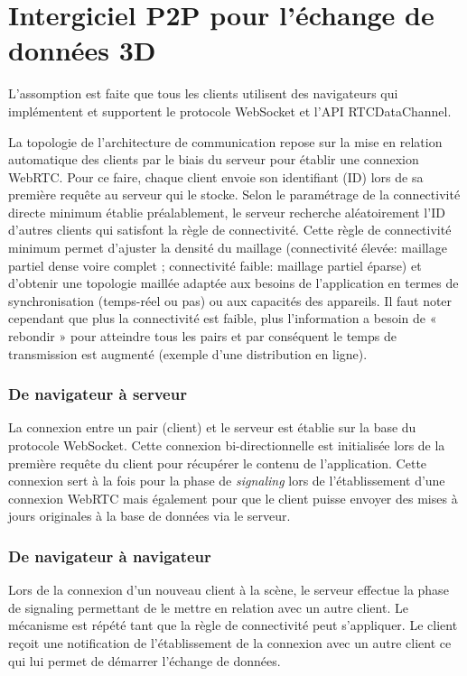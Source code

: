 \section{Intergiciel P2P pour l'échange de données 3D}

L'assomption est faite que tous les clients utilisent des navigateurs qui 
implémentent et supportent le protocole WebSocket et l'\gls{API} 
RTCDataChannel. 

La topologie de l'architecture de communication repose sur la mise en relation 
automatique des clients par le biais du serveur pour établir une connexion 
\gls{WebRTC}. Pour ce faire, chaque client envoie son identifiant (ID) lors de sa 
première requête au serveur qui le stocke. Selon le paramétrage de la connectivité 
directe minimum établie préalablement, le serveur recherche aléatoirement l'ID 
d'autres clients qui satisfont la règle de connectivité. Cette règle de connectivité 
minimum permet d'ajuster la densité du maillage (connectivité élevée: maillage 
partiel dense voire complet ; connectivité faible: maillage partiel éparse) et 
d'obtenir une topologie maillée adaptée aux besoins de l'application en termes de 
synchronisation (temps-réel ou pas) ou aux capacités des appareils. Il faut noter 
cependant que plus la connectivité est faible, plus l'information a besoin de « 
rebondir » pour atteindre tous les pairs et par conséquent le temps de 
transmission est augmenté (exemple d'une distribution en ligne). 

\subsubsection{De navigateur à serveur}
La connexion entre un pair (client) et le serveur est établie sur la base du protocole 
\gls{WebSocket}. Cette connexion bi-directionnelle est initialisée lors de la 
première requête du client pour récupérer le contenu de l'application. Cette 
connexion sert à la fois pour la phase de \textit{signaling} lors de l'établissement 
d'une connexion WebRTC mais également pour que le client puisse envoyer des 
mises à jours originales à la base de données via le serveur.

\subsubsection{De navigateur à navigateur}
Lors de la connexion d'un nouveau client à la scène, le serveur effectue la phase 
de signaling permettant de le mettre en relation avec un autre client. Le 
mécanisme est répété tant que la règle de connectivité peut s'appliquer. Le client 
reçoit une notification de l'établissement de la connexion avec un autre client ce 
qui lui permet de démarrer l'échange de données.

